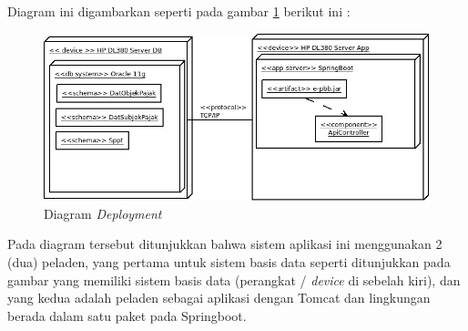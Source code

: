 Diagram ini digambarkan seperti pada gambar \ref{fig:deploy-dia} berikut ini :

\begin{figure}[H]
	\centering
	\includegraphics[width=1\textwidth]{./resources/uml/deploy-diagram}
	\caption{Diagram \textit{Deployment}}
	\label{fig:deploy-dia}
\end{figure}

Pada diagram tersebut ditunjukkan bahwa sistem aplikasi ini menggunakan 2 (dua) peladen, yang pertama untuk sistem basis data seperti ditunjukkan pada gambar yang memiliki sistem basis data (perangkat / \textit{device} di sebelah kiri), dan yang kedua adalah peladen sebagai aplikasi dengan Tomcat dan lingkungan berada dalam satu paket pada Springboot.